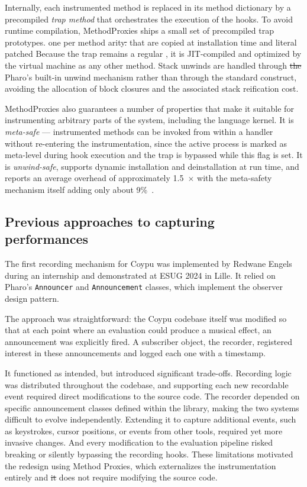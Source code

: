\documentclass[
]{ceurart}
\providecommand{\DIFadd}[1]{{\protect\color{blue}\uwave{#1}}} %
\providecommand{\DIFdel}[1]{{\protect\color{red}\sout{#1}}} %
\providecommand{\DIFaddbegin}{} %
\providecommand{\DIFaddend}{} %
\providecommand{\DIFdelbegin}{} %
\providecommand{\DIFdelend}{} %
\newcommand{\DIFscaledelfig}{0.5}
\newlength{\DIFdelgraphicswidth} %
\newlength{\DIFdelgraphicsheight} %
\newcommand{\DIFaddincludegraphics}[2][]{{\color{blue}\fbox{\DIFOincludegraphics[#1]{#2}}}} %
\newcommand{\DIFdelincludegraphics}[2][]{%
\sbox{\DIFdelgraphicsbox}{\DIFOincludegraphics[#1]{#2}}%
\settoboxwidth{\DIFdelgraphicswidth}{\DIFdelgraphicsbox} %
\settoboxtotalheight{\DIFdelgraphicsheight}{\DIFdelgraphicsbox} %
\scalebox{\DIFscaledelfig}{%
\parbox[b]{\DIFdelgraphicswidth}{\usebox{\DIFdelgraphicsbox}\\[-\baselineskip] \rule{\DIFdelgraphicswidth}{0em}}\llap{\resizebox{\DIFdelgraphicswidth}{\DIFdelgraphicsheight}{%
\setlength{\unitlength}{\DIFdelgraphicswidth}%
\begin{picture}(1,1)%
\thicklines\linethickness{2pt} %
{\color[rgb]{1,0,0}\put(0,0){\framebox(1,1){}}}%
{\color[rgb]{1,0,0}\put(0,0){\line( 1,1){1}}}%
{\color[rgb]{1,0,0}\put(0,1){\line(1,-1){1}}}%
\end{picture}%
}\hspace*{3pt}}} %
} %
\DeclareRobustCommand{\DIFaddbegin}{\DIFOaddbegin \let\includegraphics\DIFaddincludegraphics} %
\DeclareRobustCommand{\DIFaddend}{\DIFOaddend \let\includegraphics\DIFOincludegraphics} %
\DeclareRobustCommand{\DIFdelbegin}{\DIFOdelbegin \let\includegraphics\DIFdelincludegraphics} %
\DeclareRobustCommand{\DIFdelend}{\DIFOaddend \let\includegraphics\DIFOincludegraphics} %
\begin{document}
Internally, each instrumented method is replaced in its method dictionary by a precompiled \emph{trap method} that orchestrates the execution of the hooks.
To avoid runtime compilation, MethodProxies ships a small set of precompiled trap prototypes. one per method arity\DIFdelbegin \DIFdel{. }\DIFdelend \DIFaddbegin \DIFadd{, }\DIFaddend that are copied at installation time and literal patched 
Because the trap remains a regular , it is JIT-compiled and optimized by the virtual machine as any other method.
Stack unwinds are handled through \DIFdelbegin \DIFdel{the }\DIFdelend Pharo's built-in unwind mechanism rather than through the standard  construct, avoiding the allocation of block closures and the associated stack reification cost.

MethodProxies also guarantees a number of properties that make it suitable for instrumenting arbitrary parts of the system, including the language kernel. It is \emph{meta-safe} --- instrumented methods can be invoked from within a handler without re-entering the instrumentation, since the active process is marked as meta-level during hook execution and the trap is bypassed while this flag is set.
It is \emph{unwind-safe}, supports dynamic installation and deinstallation at run time, and reports an average overhead of approximately 1.5~$\times$ with the meta-safety mechanism itself adding only about 9\%~\cite{Jord24b}.

\subsection{Previous approaches to capturing performances}
The first recording mechanism for Coypu was implemented by Redwane Engels during an internship and demonstrated at ESUG 2024 in Lille.
It relied on Pharo's \texttt{Announcer} and \texttt{Announcement} classes, which implement the observer design pattern.

The approach was straightforward: the Coypu codebase itself was modified so that at each point where an evaluation could produce a musical effect, an announcement was explicitly fired.
A subscriber object, the recorder, registered interest in these announcements and logged each one with a timestamp.

It functioned as intended, but introduced significant trade-offs.
Recording logic was distributed throughout the codebase, and supporting each new recordable event required direct modifications to the source code.
The recorder depended on specific announcement classes defined within the library, making the two systems difficult to evolve independently.
Extending it to capture additional events, such as keystrokes, cursor positions, or events from other tools, required yet more invasive changes.
And every modification to the evaluation pipeline risked breaking or silently bypassing the recording hooks.
These limitations motivated the redesign using Method Proxies, which externalizes the instrumentation entirely and \DIFdelbegin \DIFdel{it }\DIFdelend does not require modifying the source code.
\end{document}

